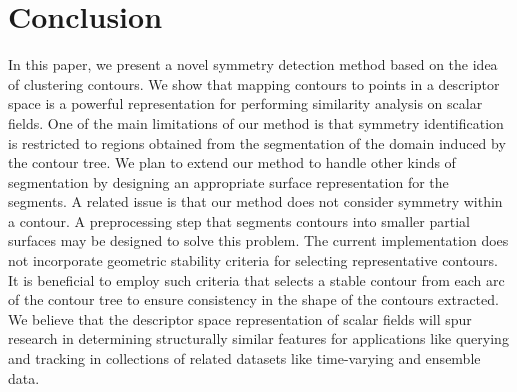\documentclass[review,journal]{vgtc}         %
\begin{document}
\section{Conclusion}
In this paper, we present a novel symmetry detection method based on the idea of clustering contours.
We show that mapping contours to points in a descriptor space is a powerful representation for
performing similarity analysis on scalar fields. One of the main limitations of our method is that
symmetry identification is restricted to regions obtained from the segmentation of the domain induced
by the contour tree. We plan to extend our method to handle other kinds of segmentation by designing
an appropriate surface representation for the segments. A related issue is that our method does not 
consider symmetry within a contour. A preprocessing step that segments contours into smaller partial
surfaces may be designed to solve this problem. The current implementation
does not incorporate geometric stability criteria for selecting representative contours. 
It is beneficial to employ such criteria that selects a stable contour 
from each arc of the contour tree to ensure consistency
in the shape of the contours extracted.
{\color{blue}We believe
that the descriptor space representation of scalar fields will spur research in determining structurally
similar features for applications like querying  and tracking in collections of related datasets 
like time-varying and ensemble data.}
%
%
%
%
%
\end{document}
